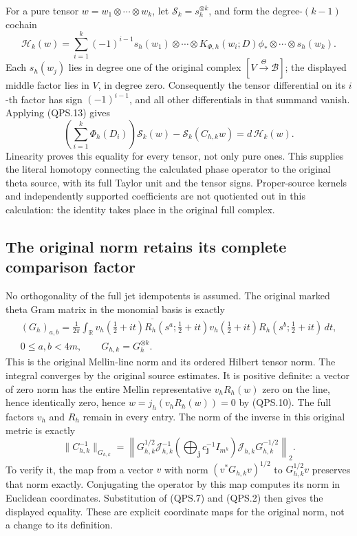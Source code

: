 For a pure tensor \(w=w_1\otimes\cdots\otimes w_k\), let
\(\mathcal S_k=s_h^{\otimes k}\), and form the degree-\((k-1)\)
cochain
\[
 \mathcal H_k(w)=
 \sum_{i=1}^k(-1)^{i-1}
 s_h(w_1)\otimes\cdots\otimes
 K_{\Phi,h}(w_i;D)\phi_*\otimes\cdots\otimes s_h(w_k).
 \tag{QPS.14}
\]
Each \(s_h(w_j)\) lies in degree one of the original complex
\([V\xrightarrow{\Theta}\mathscr B]\); the displayed middle factor
lies in \(V\), in degree zero. Consequently the tensor differential
on its \(i\)-th factor has sign \((-1)^{i-1}\), and all other
differentials in that summand vanish. Applying (QPS.13) gives
\[
 \left(\sum_{i=1}^k\Phi_h(D_i)\right)\mathcal S_k(w)
           -\mathcal S_k(C_{h,k}w)
       =d\,\mathcal H_k(w).
 \tag{QPS.15}
\]
Linearity proves this equality for every tensor, not only pure ones.
This supplies the literal homotopy connecting the calculated phase
operator to the original theta source, with its full Taylor unit
and the tensor signs. Proper-source kernels and independently
supported coefficients are not quotiented out in this calculation:
the identity takes place in the original full complex.

\subsection{The original norm retains its complete comparison factor}

No orthogonality of the full jet idempotents is assumed. The original
marked theta Gram matrix in the monomial basis is exactly
\[
 \begin{gathered}
 (G_h)_{a,b}=\frac1{2\pi}\int_{\mathbb{R}}
 \overline{v_h(\tfrac12+it)R_h(s^a;\tfrac12+it)}
 v_h(\tfrac12+it)R_h(s^b;\tfrac12+it)\,dt,\\
 0\leq a,b<4m,\qquad G_{h,k}=G_h^{\otimes k}.
 \end{gathered}
 \tag{QPS.16}
\]
This is the original Mellin-line norm and its ordered Hilbert tensor
norm. The integral converges by the original source estimates.
It is positive definite: a vector of zero norm has the entire
Mellin representative \(v_hR_h(w)\) zero on the line, hence
identically zero, hence \(w=j_h(v_hR_h(w))=0\) by (QPS.10).
The full factors \(v_h\) and \(R_h\) remain in every entry.
The norm of the inverse in this original metric is exactly
\[
 \|C_{h,k}^{-1}\|_{G_{h,k}}
 =\left\|
 G_{h,k}^{1/2}\mathcal J_{h,k}^{-1}
 \left(\bigoplus_{\mathbf j}c_{\mathbf j}^{-1}I_{m^k}\right)
 \mathcal J_{h,k}G_{h,k}^{-1/2}
 \right\|_2.
 \tag{QPS.17}
\]
To verify it, the map from a vector \(v\) with norm
\((v^*G_{h,k}v)^{1/2}\) to \(G_{h,k}^{1/2}v\) preserves that norm
exactly. Conjugating the operator by this map computes its norm
in Euclidean coordinates. Substitution of (QPS.7) and (QPS.2)
then gives the displayed equality. These are explicit coordinate
maps for the original norm, not a change to its definition.

